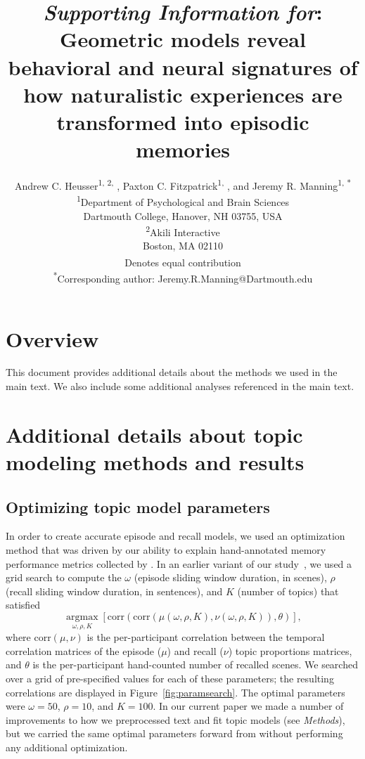 \documentclass{article}
\title{\textit{Supporting Information for}: Geometric models reveal behavioral and neural signatures of how naturalistic experiences are transformed into episodic memories}
\author{Andrew C. Heusser\textsuperscript{1, 2, \textdagger}, Paxton C. Fitzpatrick\textsuperscript{1, \textdagger}, and Jeremy R. Manning\textsuperscript{1, *}\\\textsuperscript{1}Department of Psychological and Brain Sciences\\Dartmouth College, Hanover, NH 03755, USA\\\textsuperscript{2}Akili Interactive\\Boston, MA 02110\\\textsuperscript{\textdagger}Denotes equal contribution\\\textsuperscript{*}Corresponding author: Jeremy.R.Manning@Dartmouth.edu}
\newcommand{\argmax}{\mathop{\mathrm{argmax}}\limits}
\begin{document}
\begin{titlepage}
  \maketitle
\end{titlepage}

\setcounter{equation}{0}
\setcounter{figure}{0}
\setcounter{table}{0}
\setcounter{page}{1}
\setcounter{section}{0}
\makeatletter
\renewcommand{\theequation}{S\arabic{equation}}
\renewcommand{\thefigure}{S\arabic{figure}}
\renewcommand{\bibnumfmt}[1]{[S#1]}
\renewcommand{\citenumfont}[1]{S#1}


\section*{Overview}
This document provides additional details about the methods we used in the main text.  We also include some additional analyses referenced in the main text.

\section*{Additional details about topic modeling methods and results}
\subsection*{Optimizing topic model parameters}
In order to create accurate episode and recall models, we used an optimization method that was driven by our ability to explain hand-annotated memory performance metrics collected by \cite{ChenEtal17}.  In an earlier variant of our study~\citep{HeusMann18}, we used a grid search to compute the $\omega$ (episode sliding window duration, in scenes), $\rho$ (recall sliding window duration, in sentences), and $K$ (number of topics) that satisfied
\[
\argmax_{\omega, \rho, K} \left[\mathrm{corr}\left(\mathrm{corr}\left(\mu\left(\omega, \rho, K\right), \nu\left(\omega, \rho, K\right)\right), \theta\right)\right],
\]
where $\mathrm{corr}(\mu, \nu)$ is the per-participant correlation between the temporal correlation matrices of the episode ($\mu$) and recall ($\nu$) topic proportions matrices, and $\theta$ is the per-participant hand-counted number of recalled scenes.  We searched over a grid of pre-specified values for each of these parameters; the resulting correlations are displayed in Figure~\ref{fig:paramsearch}.  The optimal parameters were $\omega = 50$, $\rho = 10$, and $K = 100$.  In our current paper we made a number of improvements to how we preprocessed text and fit topic models (see \textit{Methods}), but we carried the same optimal parameters forward from \cite{HeusMann18} without performing any additional optimization.
\end{document}
